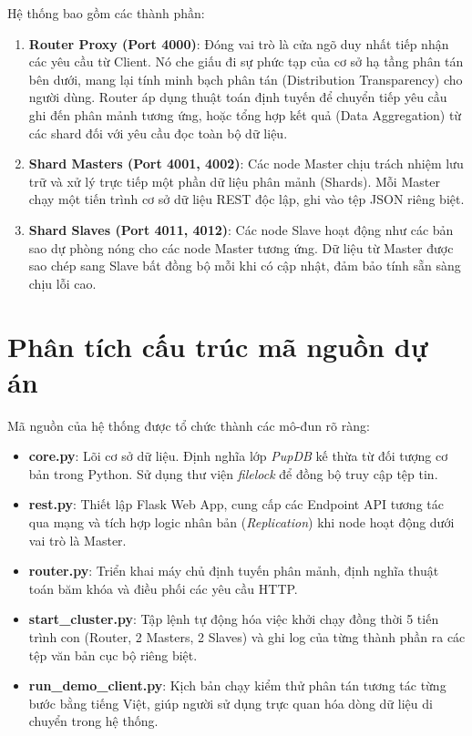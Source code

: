 \documentclass[12pt,a4paper]{report}
\begin{document}
Hệ thống bao gồm các thành phần:
\begin{enumerate}
    \item \textbf{Router Proxy (Port 4000)}: Đóng vai trò là cửa ngõ duy nhất tiếp nhận các yêu cầu từ Client. Nó che giấu đi sự phức tạp của cơ sở hạ tầng phân tán bên dưới, mang lại tính minh bạch phân tán (Distribution Transparency) cho người dùng. Router áp dụng thuật toán định tuyến để chuyển tiếp yêu cầu ghi đến phân mảnh tương ứng, hoặc tổng hợp kết quả (Data Aggregation) từ các shard đối với yêu cầu đọc toàn bộ dữ liệu.
    \item \textbf{Shard Masters (Port 4001, 4002)}: Các node Master chịu trách nhiệm lưu trữ và xử lý trực tiếp một phần dữ liệu phân mảnh (Shards). Mỗi Master chạy một tiến trình cơ sở dữ liệu REST độc lập, ghi vào tệp JSON riêng biệt.
    \item \textbf{Shard Slaves (Port 4011, 4012)}: Các node Slave hoạt động như các bản sao dự phòng nóng cho các node Master tương ứng. Dữ liệu từ Master được sao chép sang Slave bất đồng bộ mỗi khi có cập nhật, đảm bảo tính sẵn sàng chịu lỗi cao.
\end{enumerate}

\section{Phân tích cấu trúc mã nguồn dự án}
Mã nguồn của hệ thống được tổ chức thành các mô-đun rõ ràng:
\begin{itemize}
    \item \textbf{core.py}: Lõi cơ sở dữ liệu. Định nghĩa lớp \textit{PupDB} kế thừa từ đối tượng cơ bản trong Python. Sử dụng thư viện \textit{filelock} để đồng bộ truy cập tệp tin.
    \item \textbf{rest.py}: Thiết lập Flask Web App, cung cấp các Endpoint API tương tác qua mạng và tích hợp logic nhân bản (\textit{Replication}) khi node hoạt động dưới vai trò là Master.
    \item \textbf{router.py}: Triển khai máy chủ định tuyến phân mảnh, định nghĩa thuật toán băm khóa và điều phối các yêu cầu HTTP.
    \item \textbf{start\_cluster.py}: Tập lệnh tự động hóa việc khởi chạy đồng thời 5 tiến trình con (Router, 2 Masters, 2 Slaves) và ghi log của từng thành phần ra các tệp văn bản cục bộ riêng biệt.
    \item \textbf{run\_demo\_client.py}: Kịch bản chạy kiểm thử phân tán tương tác từng bước bằng tiếng Việt, giúp người sử dụng trực quan hóa dòng dữ liệu di chuyển trong hệ thống.
\end{itemize}
\end{document}
